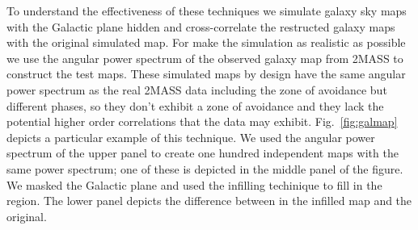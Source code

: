\documentclass[useAMS,usenatbib]{mn2e}
\begin{document}
To understand the effectiveness of these techniques we simulate galaxy
sky maps with the Galactic plane hidden and cross-correlate the
restructed galaxy maps with the original simulated map.  For make the
simulation as realistic as possible we use the angular power spectrum
of the observed galaxy map from 2MASS to construct the test maps.
These simulated maps by design have the same angular power spectrum as
the real 2MASS data including the zone of avoidance but different
phases, so they don't exhibit a zone of avoidance and they lack the
potential higher order correlations that the data may exhibit.
Fig.~\ref{fig:galmap} depicts a particular example of this technique.
We used the angular power spectrum of the upper panel to create one
hundred independent maps with the same power spectrum; one of these is
depicted in the middle panel of the figure.  We masked the Galactic
plane and used the infilling techinique to fill in the region.  The
lower panel depicts the difference between in the infilled map and the
original.
\end{document}
